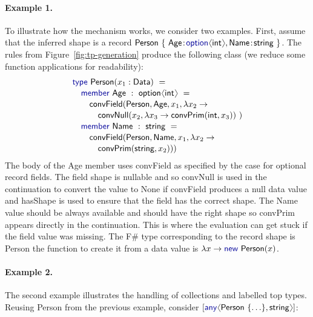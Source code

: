 \documentclass[10pt,preprint,clearpagebib]{sigplanconf}
\newcommand{\langl}{\begin{picture}(4.5,7)
\put(1.1,2.5){\rotatebox{60}{\line(1,0){5.5}}}
\put(1.1,2.5){\rotatebox{300}{\line(1,0){5.5}}}
\end{picture}}
\newcommand{\rangl}{\begin{picture}(4.5,7)
\put(.9,2.5){\rotatebox{120}{\line(1,0){5.5}}}
\put(.9,2.5){\rotatebox{240}{\line(1,0){5.5}}}
\end{picture}}
\newcommand{\kvd}[1]{\textnormal{\textcolor{kvdclr}{\sffamily #1}}}
\newcommand{\ident}[1]{\textnormal{\sffamily #1}}
\begin{document}

\paragraph{Example 1.}
To illustrate how the mechanism works, we consider two examples. First, assume 
that the inferred shape is a record  
$\ident{Person}~\{~\ident{Age}\!:\!\kvd{option}\langl\ident{int}\rangl, \ident{Name}\!:\!\ident{string}~ \}$. 
The rules from Figure~\ref{fig:tp-generation} produce the following class (we reduce some 
function applications for readability):
%
\vspace{-0.1em}
\begin{equation*}
\begin{array}{l}
 \kvd{type}~\ident{Person}(x_1:\ident{Data})~= \\[0.1em]
 \quad \kvd{member}~\ident{Age}~:~\ident{option}\langl\ident{int}\rangl~= \\[0.1em]
 \qquad \ident{convField}(\ident{Person}, \ident{Age}, x_1, \lambda x_2 \rightarrow \\[0.1em]
 \qquad \quad \ident{convNull}(x_2, \lambda x_3\rightarrow\ident{convPrim}(\ident{int}, x_3))~) \\[0.1em]
 \quad \kvd{member}~\ident{Name}~:~\ident{string}~= \\[0.1em]
 \qquad \ident{convField}(\ident{Person},\ident{Name}, x_1, \lambda x_2 \rightarrow \\[0.1em]
 \qquad \quad \ident{convPrim}(\ident{string}, x_2)))
\end{array}
\end{equation*}
%
The body of the \ident{Age} member uses \ident{convField} as specified by the case for optional
record fields. The field shape is nullable and so \ident{convNull} is used in the continuation to 
convert the value to \ident{None} if \ident{convField} produces a \kvd{null} data value and 
\ident{hasShape} is used to ensure that the field has the correct shape. The \ident{Name} value should
be always available and should have the right shape so \ident{convPrim} appears directly in the 
continuation. This is where the evaluation can get stuck if the field value was missing. The F\# 
type corresponding to the record shape is \ident{Person} the function to create it from a data value 
is $\lambda x \rightarrow \kvd{new}~\ident{Person}(x)$.

\paragraph{Example 2.} The second example illustrates the handling of collections and 
labelled top types. Reusing \ident{Person} from the previous example, consider 
$[\kvd{any}\langl\ident{Person}~\{ \ldots \},\ident{string}\rangl]$:
\end{document}
